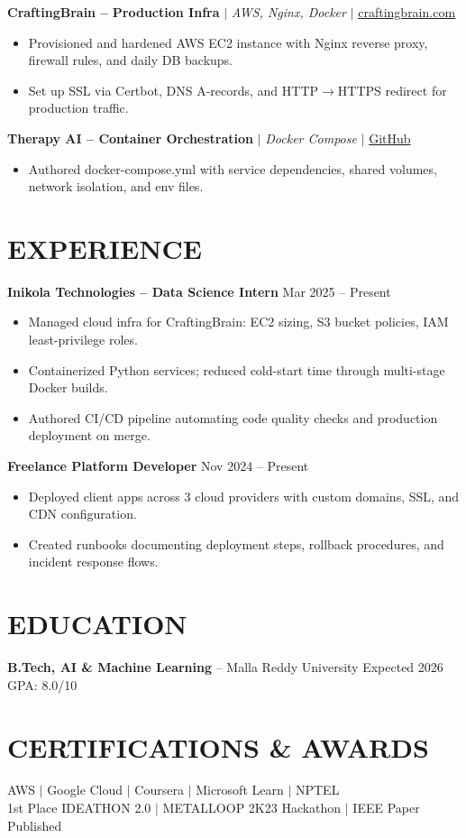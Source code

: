\documentclass[10pt]{article}
\begin{document}
\textbf{CraftingBrain -- Production Infra} $|$ \textit{AWS, Nginx, Docker} $|$ \href{https://craftingbrain.com}{craftingbrain.com}
\begin{itemize}
\item Provisioned and hardened AWS EC2 instance with Nginx reverse proxy, firewall rules, and daily DB backups.
\item Set up SSL via Certbot, DNS A-records, and HTTP$\rightarrow$HTTPS redirect for production traffic.
\end{itemize}

\textbf{Therapy AI -- Container Orchestration} $|$ \textit{Docker Compose} $|$ \href{https://github.com/JeetInTech/Virtual-Therapist---LangGraph-Agentic-AI-System}{GitHub}
\begin{itemize}
\item Authored docker-compose.yml with service dependencies, shared volumes, network isolation, and env files.
\end{itemize}

\section*{EXPERIENCE}
\textbf{Inikola Technologies -- Data Science Intern} \hfill Mar 2025 -- Present
\begin{itemize}
\item Managed cloud infra for CraftingBrain: EC2 sizing, S3 bucket policies, IAM least-privilege roles.
\item Containerized Python services; reduced cold-start time through multi-stage Docker builds.
\item Authored CI/CD pipeline automating code quality checks and production deployment on merge.
\end{itemize}

\textbf{Freelance Platform Developer} \hfill Nov 2024 -- Present
\begin{itemize}
\item Deployed client apps across 3 cloud providers with custom domains, SSL, and CDN configuration.
\item Created runbooks documenting deployment steps, rollback procedures, and incident response flows.
\end{itemize}

\section*{EDUCATION}
\textbf{B.Tech, AI \& Machine Learning} -- Malla Reddy University \hfill Expected 2026 \hfill GPA: 8.0/10

\section*{CERTIFICATIONS \& AWARDS}
AWS $|$ Google Cloud $|$ Coursera $|$ Microsoft Learn $|$ NPTEL \\
1st Place IDEATHON 2.0 $|$ METALLOOP 2K23 Hackathon $|$ IEEE Paper Published
\end{document}
